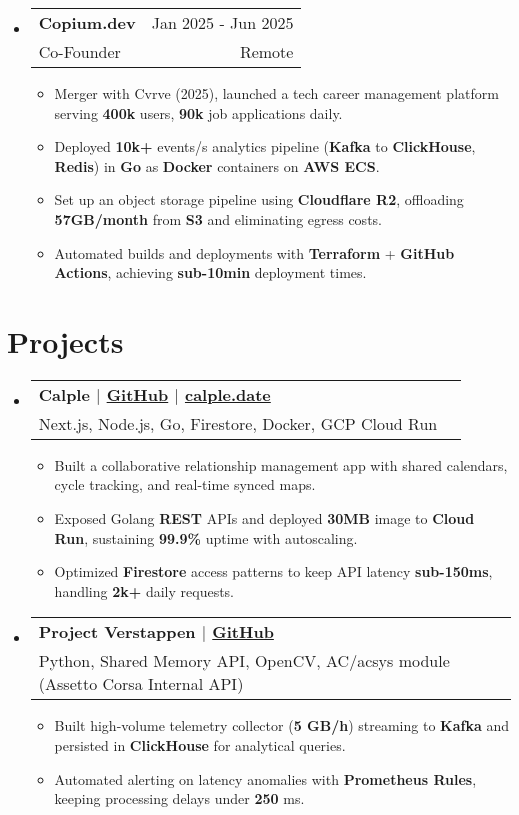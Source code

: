 \documentclass[letterpaper,11pt]{article}
\makeatletter
\newcommand{\resumeItem}[1]{
  \item{
    {#1}
  }
}
\newcommand{\resumeSubheading}[4]{
    \item
    \begin{tabular*}{0.985\textwidth}[t]{l@{\extracolsep{\fill}}r@{\hspace{-0.1in}}}
        {\textbf{#1}} & {#2} \\
        #3 &  #4 \\
    \end{tabular*}\vspace{-5pt}
}
\newcommand{\resumeSubHeadingListStart}{\begin{itemize}[leftmargin=0.00in, rightmargin=-0.2in, label={}]\vspace{3pt}}
\newcommand{\resumeSubHeadingListEnd}{\end{itemize}\vspace{-5pt}}
\newcommand{\resumeItemListStart}{\vspace{3pt}\begin{itemize}[leftmargin=0.15in, rightmargin=0.15in]}
\newcommand{\resumeItemListEnd}{\end{itemize}\vspace{-5pt}}
\makeatother
\begin{document}
\resumeSubHeadingListStart
\resumeSubheading
{Copium.dev} {Jan 2025 - Jun 2025}
{Co-Founder} {Remote}
\resumeItemListStart
\resumeItem{Merger with Cvrve (2025), launched a tech career management platform serving \textbf{400k} users, \textbf{90k} job applications daily.}
\resumeItem{Deployed \textbf{10k+} events/s analytics pipeline (\textbf{Kafka} to \textbf{ClickHouse}, \textbf{Redis}) in \textbf{Go} as \textbf{Docker} containers on \textbf{AWS ECS}.}
\resumeItem{Set up an object storage pipeline using \textbf{Cloudflare R2}, offloading \textbf{57GB/month} from \textbf{S3} and eliminating egress costs.}
\resumeItem{Automated builds and deployments with \textbf{Terraform} + \textbf{GitHub Actions}, achieving \textbf{sub-10min} deployment times.}
\resumeItemListEnd
\resumeSubHeadingListEnd


\section{Projects}
\resumeSubHeadingListStart
\resumeSubheading
{\textbf{Calple} \textnormal{$|$ \href{https://github.com/juhun32/calple}{GitHub} $|$ \href{https://www.calple.date}{calple.date}}} {}
{{Next.js, Node.js, Go, Firestore, Docker, GCP Cloud Run}}{}
\resumeItemListStart
\resumeItem{Built a collaborative relationship management app with shared calendars, cycle tracking, and real-time synced maps.}
\resumeItem{Exposed Golang \textbf{REST} APIs and deployed \textbf{30MB} image to \textbf{Cloud Run}, sustaining \textbf{99.9\%} uptime with autoscaling.}
\resumeItem{Optimized \textbf{Firestore} access patterns to keep API latency \textbf{sub-150ms}, handling \textbf{2k+} daily requests.}
\resumeItemListEnd
\resumeSubHeadingListEnd

\resumeSubHeadingListStart
\resumeSubheading
{\textbf{Project Verstappen} \textnormal{$|$ \href{https://github.com/juhun32/project-verstappen}{GitHub}}} {}
{{Python, Shared Memory API, OpenCV, AC/acsys module (Assetto Corsa Internal API)}}{}
\resumeItemListStart
\resumeItem{Built high-volume telemetry collector (\textbf{5 GB/h}) streaming to \textbf{Kafka} and persisted in \textbf{ClickHouse} for analytical queries.}
\resumeItem{Automated alerting on latency anomalies with \textbf{Prometheus Rules}, keeping processing delays under \textbf{250} ms.}
\resumeItemListEnd
\resumeSubHeadingListEnd

\end{document}
